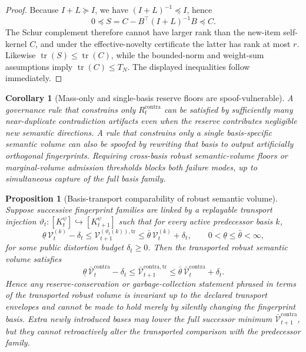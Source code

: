 \documentclass[11pt]{article}
\newtheorem{proposition}[theorem]{Proposition}
\newtheorem{corollary}[theorem]{Corollary}
\theoremstyle{definition}
\newcommand{\1}{\mathbf{1}}
\begin{document}
\begin{proof}
Because $I+L\succeq I$, we have $(I+L)^{-1}\preceq I$, hence
\[
0\preceq S=C-B^\top(I+L)^{-1}B\preceq C.
\]
The Schur complement therefore cannot have larger rank than the new-item self-kernel $C$, and under the effective-novelty certificate the latter has rank at most $r$. Likewise $\operatorname{tr}(S)\le \operatorname{tr}(C)$, while the bounded-norm and weight-sum assumptions imply $\operatorname{tr}(C)\le T_N$. The displayed inequalities follow immediately.
\end{proof}


\begin{corollary}[Mass-only and single-basis reserve floors are spoof-vulnerable]\label{cor:mass_only_spam}
A governance rule that constrains only $R_t^{\mathrm{contra}}$ can be satisfied by sufficiently many near-duplicate contradiction artifacts even when the reserve contributes negligible new semantic directions. A rule that constrains only a \emph{single} basis-specific semantic volume can also be spoofed by rewriting that basis to output artificially orthogonal fingerprints. Requiring cross-basis robust semantic-volume floors or marginal-volume admission thresholds blocks both failure modes, up to simultaneous capture of the full basis family.
\end{corollary}

\begin{proposition}[Basis-transport comparability of robust semantic volume]\label{prop:semantic_transport}
Suppose successive fingerprint families are linked by a replayable transport injection $\vartheta_t:[K_t^{\psi}]\hookrightarrow [K_{t+1}^{\psi}]$ such that for every active predecessor basis $k$,
\[
\underline\theta\,\mathcal V_t^{(k)} - \delta_t \le \mathcal V_{t+1}^{(\vartheta_t(k)),\mathrm{tr}} \le \bar\theta\,\mathcal V_t^{(k)} + \delta_t,
\qquad
0<\underline\theta\le \bar\theta<\infty,
\]
for some public distortion budget $\delta_t\ge 0$. Then the transported robust semantic volume satisfies
\[
\underline\theta\,\bar{\mathcal V}_t^{\mathrm{contra}}-\delta_t
\le
\bar{\mathcal V}_{t+1}^{\mathrm{contra},\mathrm{tr}}
\le
\bar\theta\,\bar{\mathcal V}_t^{\mathrm{contra}}+\delta_t.
\]
Hence any reserve-conservation or garbage-collection statement phrased in terms of the transported robust volume is invariant up to the declared transport envelopes and cannot be made to hold merely by silently changing the fingerprint basis. Extra newly introduced bases may lower the full successor minimum $\bar{\mathcal V}_{t+1}^{\mathrm{contra}}$, but they cannot retroactively alter the transported comparison with the predecessor family.
\end{proposition}
\end{document}
